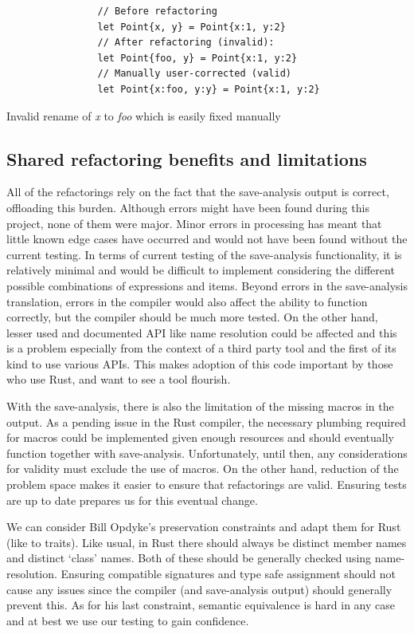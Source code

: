 \begin{fig}
\begin{verbatim}
                // Before refactoring
                let Point{x, y} = Point{x:1, y:2}
                // After refactoring (invalid):
                let Point{foo, y} = Point{x:1, y:2}
                // Manually user-corrected (valid)
                let Point{x:foo, y:y} = Point{x:1, y:2}
\end{verbatim}
\caption{Invalid rename of \emph{x} to \emph{foo} which is easily fixed manually}
\label{Fig:fix}
\end{fig}

\subsection{Shared refactoring benefits and limitations}
All of the refactorings rely on the fact that the save-analysis output is correct, offloading this burden. Although errors might have been found during this project, none of them were major. Minor errors in processing has meant that little known edge cases have occurred and would not have been found without the current testing. In terms of current testing of the save-analysis functionality, it is relatively minimal and would be difficult to implement considering the different possible combinations of expressions and items. Beyond errors in the save-analysis translation, errors in the compiler would also affect the ability to function correctly, but the compiler should be much more tested. On the other hand, lesser used and documented API like name resolution could be affected and this is a problem especially from the context of a third party tool and the first of its kind to use various APIs. This makes adoption of this code important by those who use Rust, and want to see a tool flourish.

With the save-analysis, there is also the limitation of the missing macros in the output. As a pending issue in the Rust compiler, the necessary plumbing required for macros could be implemented given enough resources and should eventually function together with save-analysis. Unfortunately, until then, any considerations for validity must exclude the use of macros. On the other hand, reduction of the problem space makes it easier to ensure that refactorings are valid. Ensuring tests are up to date prepares us for this eventual change.

We can consider Bill Opdyke's preservation constraints and adapt them for Rust (like to traits). Like usual, in Rust there should always be distinct member names and distinct `class' names. Both of these should be generally checked using name-resolution. Ensuring compatible signatures and type safe assignment should not cause any issues since the compiler (and save-analysis output) should generally prevent this. As for his last constraint, semantic equivalence is hard in any case and at best we use our testing to gain confidence.

